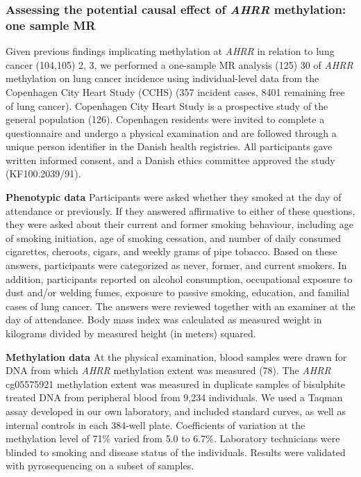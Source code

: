 \documentclass[11pt,twoside]{bristolthesis}
\begin{document}
\hypertarget{assessing-the-potential-causal-effect-of-ahrr-methylation-one-sample-mr}{%
\subsubsection{\texorpdfstring{Assessing the potential causal effect of \emph{AHRR} methylation: one sample MR}{Assessing the potential causal effect of AHRR methylation: one sample MR}}\label{assessing-the-potential-causal-effect-of-ahrr-methylation-one-sample-mr}}

Given previous findings implicating methylation at \emph{AHRR} in relation to lung cancer (104,105) 2, 3, we performed a one-sample MR analysis (125) 30 of \emph{AHRR} methylation on lung cancer incidence using individual-level data from the Copenhagen City Heart Study (CCHS) (357 incident cases, 8401 remaining free of lung cancer). Copenhagen City Heart Study is a prospective study of the general population (126). Copenhagen residents were invited to complete a questionnaire and undergo a physical examination and are followed through a unique person identifier in the Danish health registries. All participants gave written informed consent, and a Danish ethics committee approved the study (KF100.2039/91).

\textbf{Phenotypic data}
Participants were asked whether they smoked at the day of attendance or previously. If they answered affirmative to either of these questions, they were asked about their current and former smoking behaviour, including age of smoking initiation, age of smoking cessation, and number of daily consumed cigarettes, cheroots, cigars, and weekly grams of pipe tobacco. Based on these answers, participants were categorized as never, former, and current smokers. In addition, participants reported on alcohol consumption, occupational exposure to dust and/or welding fumes, exposure to passive smoking, education, and familial cases of lung cancer. The answers were reviewed together with an examiner at the day of attendance. Body mass index was calculated as measured weight in kilograms divided by measured height (in meters) squared.

\textbf{Methylation data}
At the physical examination, blood samples were drawn for DNA from which \emph{AHRR} methylation extent was measured (78). The \emph{AHRR} cg05575921 methylation extent was measured in duplicate samples of bisulphite treated DNA from peripheral blood from 9,234 individuals. We used a Taqman assay developed in our own laboratory, and included standard curves, as well as internal controls in each 384-well plate. Coefficients of variation at the methylation level of 71\% varied from 5.0 to 6.7\%. Laboratory technicians were blinded to smoking and disease status of the individuals. Results were validated with pyrosequencing on a subset of samples.
\end{document}
